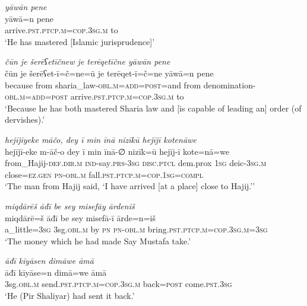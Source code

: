 \ea \label{ŽP.85}
\textit{yāwān pene} \\ 
\gll yāwā=n pene \\ 
 arrive\textsc{.pst}\textsc{.ptcp}\textsc{.m}\textsc{=cop}\textsc{.3sg}\textsc{.m} to \\ 
\glt `He has mastered [Islamic jurisprudence]'
\z 
 
\ea \label{ŽP.88}
\textit{čūn je šerēʕetīčnew je terēqetīčne yāwān pene} \\ 
\gll čūn je šerēʕet-ī=č=ne=ū je terēqet-ī=č=ne yāwā=n pene \\ 
 because from sharia\_law\textsc{-obl}\textsc{.m}\textsc{=add}\textsc{=\textsc{post}}=and from denomination\textsc{-obl}\textsc{.m}\textsc{=add}\textsc{=\textsc{post}} arrive\textsc{.pst}\textsc{.ptcp}\textsc{.m}\textsc{=cop}\textsc{.3sg}\textsc{.m} to \\ 
\glt `Because he has both mastered Sharia law and [is capable of leading an] order (of dervishes).'
\z 
 
\ea \label{ŽP.102}
\textit{hejījīyeke māčo, dey ī min īnā nizīkū hejījī kotenāwe} \\ 
\gll hejījī-eke m-āč-o dey ī min īnā-∅ nizīk=ū hejīj-ī kote=nā=we \\ 
 from\_Hajij\textsc{-def}\textsc{.dir}\textsc{.m} \textsc{ind-}say\textsc{.prs}\textsc{-3sg} \textsc{disc.ptcl} dem.prox \textsc{1sg} deic\textsc{-3sg}\textsc{.m} close\textsc{\textsc{=ez.gen}} \textsc{pn}\textsc{-obl}\textsc{.m} fall\textsc{.pst}\textsc{.ptcp}\textsc{.m}\textsc{=cop}\textsc{.\textsc{1sg}}\textsc{=compl} \\ 
\glt `The man from Hajij said, ‘I have arrived [at a place] close to Hajij.’'
\z 
 
\ea \label{ŽP.113}
\textit{miqdārēš āđī be sey misefāy ārdeniš} \\ 
\gll miqdārē=š āđī be sey misefā-ī ārde=n=iš \\ 
 a\_little\textsc{=3sg} 3sg\textsc{.obl}\textsc{.m} by \textsc{pn} \textsc{pn}\textsc{-obl}\textsc{.m} bring\textsc{.pst}\textsc{.ptcp}\textsc{.m}\textsc{=cop}\textsc{.3sg}\textsc{.m}\textsc{=3sg} \\ 
\glt `The money which he had made Say Mustafa take.'
\z 
 
\ea \label{ŽP.115}
\textit{āđī kīyāsen dimāwe āmā} \\ 
\gll āđī kīyāse=n dimā=we āmā \\ 
 3sg\textsc{.obl}\textsc{.m} send\textsc{.pst}\textsc{.ptcp}\textsc{.m}\textsc{=cop}\textsc{.3sg}\textsc{.m} back\textsc{=\textsc{post}} come\textsc{.pst}\textsc{.3sg} \\ 
\glt `He (Pir Shaliyar) had sent it back.'
\z 
 
